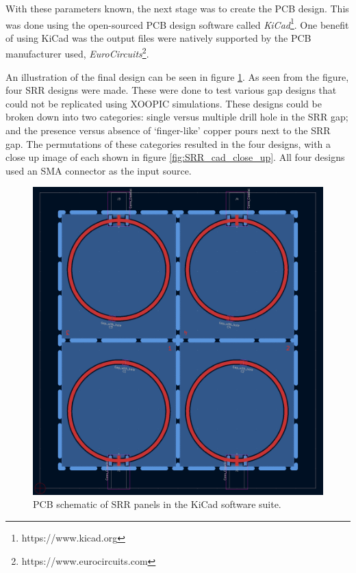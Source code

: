 With these parameters known, the next stage was to create the PCB design. This was done using the open-sourced PCB design software called \textit{KiCad}\footnote{https://www.kicad.org}. One benefit of using KiCad was the output files were natively supported by  the PCB manufacturer used, \textit{EuroCircuits}\footnote{https://www.eurocircuits.com}. 

An illustration of the final design can be seen in figure \ref{fig:SRR_cad}. As seen from the figure, four SRR designs were made. These were done to test various gap designs that could not be replicated using XOOPIC simulations. These designs could be broken down into two categories: single versus multiple drill hole in the SRR gap; and the presence versus absence of `finger-like' copper pours next to the SRR gap. The permutations of these categories resulted in the four designs, with a close up image of each shown in figure \ref{fig:SRR_cad_close_up}. All four designs used an SMA connector as the input source. 

\pagebreak

\begin{figure}[h!]
	\centering
	\includegraphics[width=\linewidth]{chapter_4/figures/SRR_CAD.png}
	\caption{PCB schematic of SRR panels in the KiCad software suite.}
	\label{fig:SRR_cad}
\end{figure}

